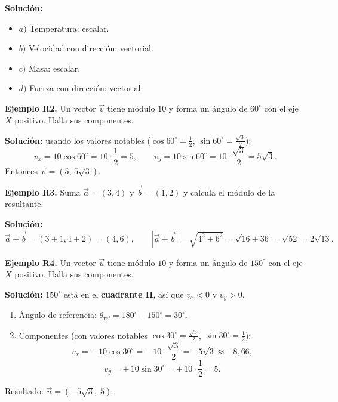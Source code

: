 \documentclass[12pt, letterpaper]{article}
\providecommand{\sen}{\sin}
\begin{document}
\begin{cuadrosolucion}
  \textbf{Solución:}
  \begin{itemize}
    \item $a)$ Temperatura: escalar.
    \item $b)$ Velocidad con dirección: vectorial.
    \item $c)$ Masa: escalar.
    \item $d)$ Fuerza con dirección: vectorial.
  \end{itemize}
\end{cuadrosolucion}

\textbf{Ejemplo R2.} Un vector $\vec{v}$ tiene módulo $10$ y forma un ángulo de $60^{\circ}$ con el eje $X$ positivo. Halla sus componentes.

\begin{cuadrosolucion}
  \textbf{Solución:} usando los valores notables ($\cos 60^{\circ} = \tfrac{1}{2}$, $\sen 60^{\circ} = \tfrac{\sqrt{3}}{2}$):
  $$v_x = 10 \cos 60^{\circ} = 10 \cdot \frac{1}{2} = 5, \qquad v_y = 10 \sen 60^{\circ} = 10 \cdot \frac{\sqrt{3}}{2} = 5\sqrt{3}.$$
  Entonces $\vec{v} = (5,\, 5\sqrt{3})$.
\end{cuadrosolucion}

\textbf{Ejemplo R3.} Suma $\vec{a} = (3, 4)$ y $\vec{b} = (1, 2)$ y calcula el módulo de la resultante.

\begin{cuadrosolucion}
  \textbf{Solución:}
  $$\vec{a} + \vec{b} = (3 + 1, 4 + 2) = (4, 6), \qquad |\vec{a} + \vec{b}| = \sqrt{4^2 + 6^2} = \sqrt{16 + 36} = \sqrt{52} = 2\sqrt{13}.$$
\end{cuadrosolucion}

\textbf{Ejemplo R4.} Un vector $\vec{u}$ tiene módulo $10$ y forma un ángulo de $150^{\circ}$ con el eje $X$ positivo. Halla sus componentes.

\begin{cuadrosolucion}
  \textbf{Solución:} $150^{\circ}$ está en el \textbf{cuadrante II}, así que $v_x < 0$ y $v_y > 0$.
  \begin{enumerate}[leftmargin=*, label=\arabic*.]
    \item Ángulo de referencia: $\theta_{\text{ref}} = 180^{\circ} - 150^{\circ} = 30^{\circ}$.
    \item Componentes (con valores notables $\cos 30^{\circ} = \frac{\sqrt{3}}{2}$, $\sen 30^{\circ} = \frac{1}{2}$):
          $$v_x = -\,10\cos 30^{\circ} = -\,10 \cdot \frac{\sqrt{3}}{2} = -5\sqrt{3} \approx -8{,}66,$$
          $$v_y = +\,10\sen 30^{\circ} = +\,10 \cdot \frac{1}{2} = 5.$$
  \end{enumerate}
  Resultado: $\vec{u} = (-5\sqrt{3},\; 5)$.
\end{cuadrosolucion}
\end{document}

